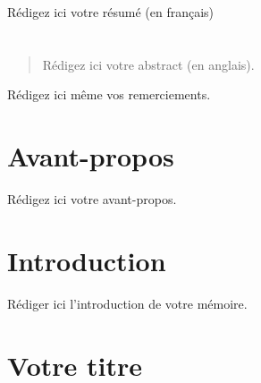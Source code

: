 \documentclass[12pt]{ulaval}
\date{Mois Année}
\begin{document}
  \maketitle

\frontmatter %
\pagestyle{plain} %
\setcounter{page}{2}
  \begin{resume}
    Rédigez ici votre résumé (en français)

    \hypertarget{section-1}{%
    \chapter*{}\label{section-1}}
  \end{resume}
  \begin{abstract}
    Rédigez ici votre abstract (en anglais).
  \end{abstract}
% 
  \hypersetup{linkcolor=black}
   \setcounter{tocdepth}{2}
  \tableofcontents

  \listoftables

  \listoffigures
  \begin{remerciements}
    Rédigez ici même vos remerciements.

    \hypertarget{section}{%
    \chapter*{}\label{section}}

    \hypertarget{avant-propos}{%
    \chapter{Avant-propos}\label{avant-propos}}

    Rédigez ici votre avant-propos.
  \end{remerciements}
% 
\mainmatter %
\pagestyle{fancyplain} %

\doublespace

\hypertarget{introduction}{%
\chapter*{Introduction}\label{introduction}}

Rédiger ici l'introduction de votre mémoire.

\hypertarget{votre-titre}{%
\chapter{Votre titre}\label{votre-titre}}
\end{document}

